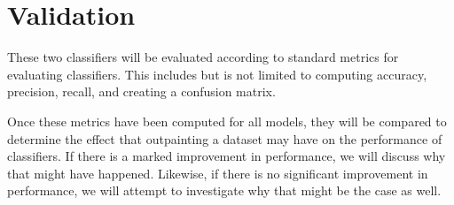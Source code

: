 \documentclass[12pt, letterpaper]{article}
\begin{document}
\section{Validation}

These two classifiers will be evaluated according to standard metrics for evaluating classifiers. This includes but is not limited to computing accuracy, precision, recall, and creating a confusion matrix.

Once these metrics have been computed for all models, they will be compared to determine the effect that outpainting a dataset may have on the performance of classifiers. If there is a marked improvement in performance, we will discuss why that might have happened. Likewise, if there is no significant improvement in performance, we will attempt to investigate why that might be the case as well.
\end{document}
